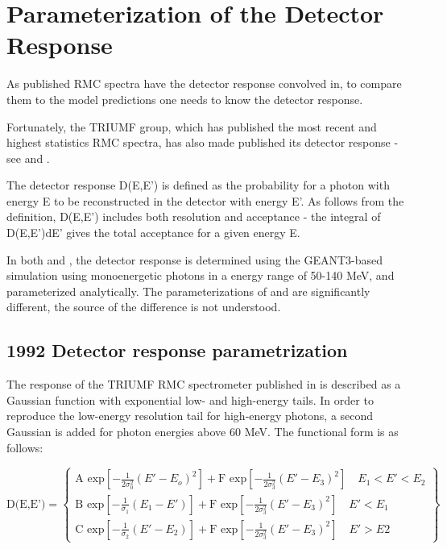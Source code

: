 \section { Parameterization of the Detector Response}

As published RMC spectra have the detector response convolved in, to compare
them to the model predictions one needs to know the detector response.

Fortunately, the TRIUMF group, which has published the most recent and highest statistics
RMC spectra, has also made published its detector response -
see \cite{RMC_1992_PhysRevC.46.1094} and \cite{RMC_1998_PhysRevC.58.1767}. 

The detector response D(E,E') is defined as the probability for a photon
with energy E to be reconstructed in the detector with energy E'. As follows from the
definition, D(E,E') includes both resolution and acceptance - the integral of D(E,E')dE'
gives the total acceptance for a given energy E.

In both \cite{RMC_1992_PhysRevC.46.1094} and \cite{RMC_1998_PhysRevC.58.1767}, the
detector response is determined using the GEANT3-based simulation using monoenergetic
photons in a energy range of 50-140 MeV, and parameterized analytically.
The parameterizations of  \cite{RMC_1992_PhysRevC.46.1094} and \cite{RMC_1998_PhysRevC.58.1767}
are significantly different, the source of the difference is not understood.

\subsection { 1992 Detector response parametrization }

The response of the TRIUMF RMC spectrometer published in \cite{RMC_1992_PhysRevC.46.1094}
is described as a Gaussian function with exponential low- and  high-energy tails.
In order to reproduce the low-energy resolution tail for high-energy photons, a second Gaussian
is added for photon energies above 60 MeV. The functional form is as follows:

\begin{equation}
  \label{eq:001}
\text{D(E,E')}= \left\{
\begin{array}{ll}
                \text{A exp}\left[-\frac{1}{2\sigma_0^2}(E'-E_o)^2\right]+
                \text{F exp}\left[-\frac{1}{2\sigma_3^2}(E'-E_3)^2\right]
 \quad E_1<E'<E_2 \\
                \text{B exp}\left[-\frac{1}{\sigma_1}(E_1-E') \right]+
                \text{F exp}\left[-\frac{1}{2\sigma_3^2}(E'-E_3)^2\right]
 \quad E'<E_1      \\  
                \text{C exp}\left[-\frac{1}{\sigma_2}(E'-E_2)\right]+
                \text{F exp}\left[-\frac{1}{2\sigma_3^2}(E'-E_3)^2\right]
 \quad E'>E2     
 \end{array}
 \right\}
\end{equation}
 
